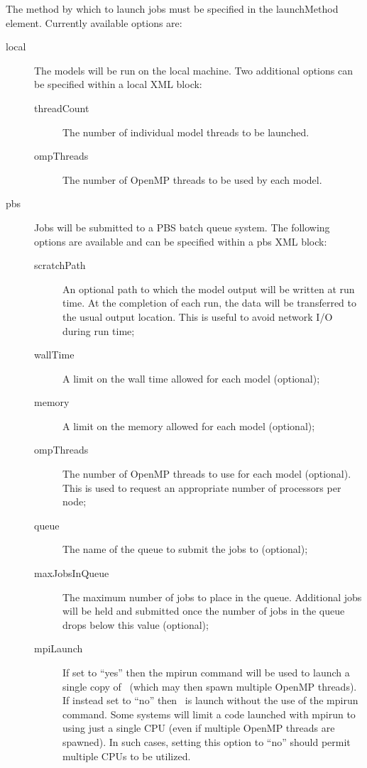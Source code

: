 The method by which to launch jobs must be specified in the {\normalfont \ttfamily launchMethod} element. Currently available options are:
\begin{description}
\item[{\normalfont \ttfamily local}] The models will be run on the local machine. Two additional options can be specified within a {\normalfont \ttfamily local} XML block:
\begin{description}
\item[{\normalfont \ttfamily threadCount}] The number of individual model threads to be launched.
\item[{\normalfont \ttfamily ompThreads}] The number of OpenMP threads to be used by each model.
\end{description}

\item[{\normalfont \ttfamily pbs}] Jobs will be submitted to a {\normalfont \ttfamily PBS} batch queue system. The following options are available and can be specified within a {\normalfont \ttfamily pbs} XML block:
\begin{description}
\item[{\normalfont \ttfamily scratchPath}] An optional path to which the model output will be written at run time. At the completion of each run, the data will be transferred to the usual output location. This is useful to avoid network I/O during run time;
\item[{\normalfont \ttfamily wallTime}] A limit on the wall time allowed for each model (optional);
\item[{\normalfont \ttfamily memory}] A limit on the memory allowed for each model (optional);
\item[{\normalfont \ttfamily ompThreads}] The number of OpenMP threads to use for each model (optional). This is used to request an appropriate number of processors per node;
\item[{\normalfont \ttfamily queue}] The name of the queue to submit the jobs to (optional);
\item[{\normalfont \ttfamily maxJobsInQueue}] The maximum number of jobs to place in the queue. Additional jobs will be held and submitted once the number of jobs in the queue drops below this value (optional);
\item[{\normalfont \ttfamily mpiLaunch}] If set to ``{\normalfont \ttfamily yes}'' then the {\normalfont \ttfamily mpirun} command will be used to launch a single copy of \glc\ (which may then spawn multiple OpenMP threads). If instead set to ``{\normalfont \ttfamily no}'' then \glc\ is launch without the use of the {\normalfont \ttfamily mpirun} command. Some systems will limit a code launched with {\normalfont \ttfamily mpirun} to using just a single CPU (even if multiple OpenMP threads are spawned). In such cases, setting this option to ``{\normalfont \ttfamily no}'' should permit multiple CPUs to be utilized.

\end{description}
\end{description}
